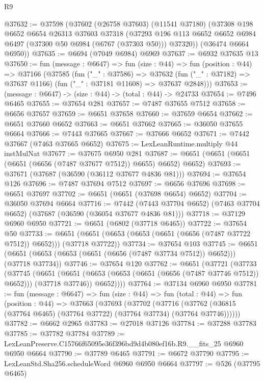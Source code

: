 \begin{lexlean}{R9}
\begin{coremodule}
@37632 := @37598
    (@37602
      (@26758 @37603)
      (@11541 @37180)
      (@37308
        @198
        @6652
        @6654
        @26313
        @37603
        @37318
        (@37293 @196 @113 @6652 @6652 @6984 @6497 (@37300 @50 @6984 (@6767 (@37303 @50))) @37320))
      (@36474 @6664 @6950))
@37635 := @6694 (@7049 @6984) @6969
@37637 := @6932 @37635 @13
@37650 := fun (message : @6647) =>
  fun (size : @44) =>
  fun (position : @44) =>
  @37166
    (@37585
      (fun ("_" : @37586) =>
      @37632 (fun ("_" : @37182) => @37637 @1166) (fun ("_" : @37181 @11608) => @37637 @2848)))
@37653 := (message : @6647) -> (size : @44) -> (total : @44) -> @24733
@37654 := @7496 @6465
@37655 := @37654 @281
@37657 := @7487 @37655 @7512
@37658 := @6656 @37657
@37659 := @6651 @37658
@37660 := @37659 @6654
@37662 := @6651 @37660 @6652
@37663 := @6651 @37662
@37665 := @36050 @37655 @6664
@37666 := @7443 @37665
@37667 := @37666 @6652
@37671 := @7442 @37667 (@7463 @37665 @6652)
@37675 := LexLeanRuntime.multiply @44 instMulNat
@37677 := @37675 @6950 @281
@37687 := @6651 (@6651 (@6651 (@6651 (@6656 (@7487 @37677 @7512)) @6655) @6652) @6652)
@37693 := @37671 (@37687 (@36590 (@36112 @37677 @4836 @81)))
@37694 := @37654 @126
@37696 := @7487 @37694 @7512
@37697 := @6656 @37696
@37698 := @6651 @37697
@37702 := @6651 (@6651 (@37698 @6654) @6652)
@37704 := @36050 @37694 @6664
@37716 := @7442
    (@7443 @37704 @6652)
    (@7463 @37704 @6652)
    (@37687 (@36590 (@36054 @37677 @4836 @81)))
@37718 := @37129 @6960 @6950
@37721 := @6651 (@6802 (@37718 @6465))
@37722 := @37654 @50
@37733 := @6651 (@6651 (@6653 (@6653 (@6651 (@6656 (@7487 @37722 @7512)) @6652))) (@37718 @37722))
@37734 := @37654 @103
@37745 := @6651 (@6651 (@6653 (@6653 (@6651 (@6656 (@7487 @37734 @7512)) @6652))) (@37718 @37734))
@37746 := @37654 @120
@37762 := @6651
    (@37721
      (@37733
        (@37745
          (@6651
            (@6651 (@6653 (@6653 (@6651 (@6656 (@7487 @37746 @7512)) @6652))) (@37718 @37746))
            @6652))))
@37764 := @37134 @6960 @6950
@37781 := fun (message : @6647) =>
  fun (size : @44) =>
  fun (total : @44) =>
  fun (position : @44) =>
  @37663
    (@37693
      (@37702
        (@37716 (@37762 (@36815 (@37764 @6465) (@37764 @37722) (@37764 @37734) (@37764 @37746))))))
@37782 := @6662 @2965
@37783 := @27018 @37126
@37784 := @37288 @37783
@37785 := @37782 @37784
@37789 := LexLeanPreserve.C15766f65095e36f396bd9d4b080ef16b.R9.__fits_25 @6960 @6950 @6664
@37790 := @37789 @6465
@37791 := @6672 @37790
@37795 := LexLeanStd.Sha256.scheduleWord @6960 @6950 @6664
@37797 := @526 (@37795 @6465)

\end{coremodule}
\end{lexlean}
